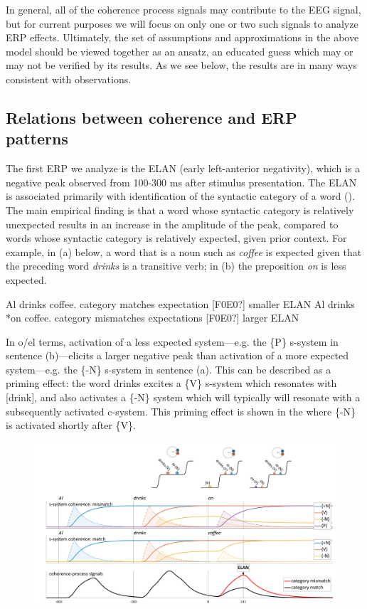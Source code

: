 In general, all of the coherence process signals may contribute to the EEG signal, but for current purposes we will focus on only one or two such signals to analyze ERP effects. Ultimately, the set of assumptions and approximations in the above model should be viewed together as an ansatz, an educated guess which may or may not be verified by its results. As we see below, the results are in many ways consistent with observations.

\subsection{Relations between coherence and ERP patterns}

The first ERP we analyze is the ELAN (early left-anterior negativity), which is a negative peak observed from 100-300 ms after stimulus presentation. The ELAN is associated primarily with identification of the syntactic category of a word (\citealt{Friederici2002,HahneFriederici1999,SteinhauerDrury2012}). The main empirical finding is that a word whose syntactic category is relatively unexpected results in an increase in the amplitude of the peak, compared to words whose syntactic category is relatively expected, given prior context. For example, in (a) below, a word that is a noun such as \textit{coffee} is expected given that the preceding word \textit{drinks} is a transitive verb; in (b) the preposition \textit{on} is less expected.

\ea
\ea Al drinks coffee.         category matches expectation [F0E0?] smaller ELAN
\ex Al drinks *on coffee.    category mismatches expectations [F0E0?] larger ELAN
\z
\z

In o/el terms, activation of a less expected system—e.g. the \{P\} s-system in sentence (b)—elicits a larger negative peak than activation of a more expected system—e.g. the \{-N\} s-system in sentence (a). This can be described as a priming effect: the word drinks excites a \{V\} s-system which resonates with [drink], and also activates a \{-N\} system which will typically will resonate with a subsequently activated c-system. This priming effect is shown in the {\figurebelow} where \{-N\} is activated shortly after \{V\}. 

  
\begin{figure}
\includegraphics[width=\textwidth]{figures/Tilsen-img142.png}
\caption{\missingcaption}
\label{fig:6:23}
\end{figure}
 

